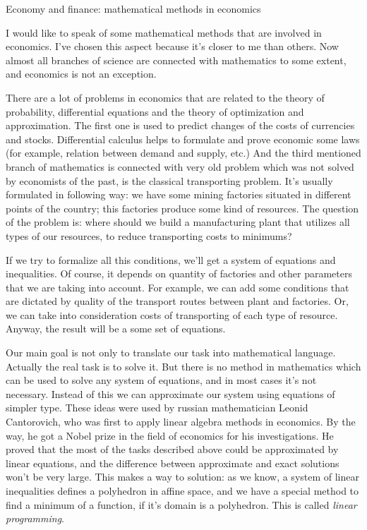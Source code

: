 \documentclass[a4paper,12pt]{article}
\begin{document}
\begin{center} {\LARGE Economy and finance: mathematical methods in economics} \end{center}

I would like to speak of some mathematical methods that are involved in economics.
I've chosen this aspect because it's closer to me than others. Now almost all branches of science are connected with mathematics to some extent,
and economics is not an exception.

There are a lot of problems in economics that are related to the theory of probability, differential equations and the theory of optimization and
approximation.
The first one is used to predict changes of the costs of currencies and stocks. Differential calculus helps to formulate and prove
economic some laws (for example, relation between demand and supply, etc.) And the third mentioned branch of mathematics is connected with very old
problem which was not solved by economists of the past, is the classical transporting problem. It's usually formulated in following way:
we have some mining factories situated in different points of the country; this factories produce some kind of resources. The question of the problem is:
where should we build a manufacturing plant that utilizes all types of our resources, to reduce transporting costs to minimums?

If we try to formalize all this conditions, we'll get a system of equations and inequalities. Of course, it depends on quantity of factories and other
parameters that we are taking into account. For example, we can add some conditions that are dictated by quality of the transport routes between plant and
factories. Or, we can take into consideration costs of transporting of each type of resource. Anyway, the result will be a some set of equations.

Our main goal is not only to translate our task into mathematical language. Actually the real task is to solve it. But there is no method in mathematics
which can be used to solve any system of equations, and in most cases it's not necessary. Instead of this we can approximate our system using equations
of simpler type. These ideas were used by russian mathematician Leonid Cantorovich, who was first to apply linear algebra methods in economics.
By the way, he got a Nobel prize in the field of economics for his investigations. He proved that the most of the tasks described above could be approximated
by linear equations, and the difference between approximate and exact solutions won't be very large. This makes a way to solution: as we know,
a system of linear inequalities defines a polyhedron in affine space, and we have a special method to find a minimum of a function, if it's domain is a
polyhedron. This is called \textit{linear programming}.
\end{document}
